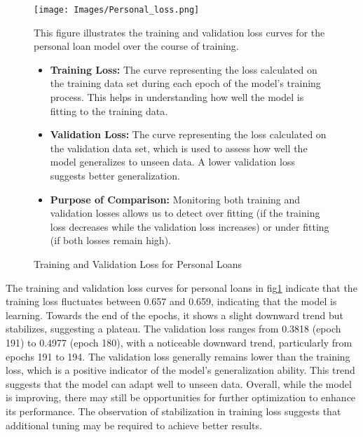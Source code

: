 \documentclass[a4paper]{article}
\begin{document}
\begin{figure}[H]
	\centering
	\texttt{[image: Images/Personal\_loss.png]} %
	\caption{Training and Validation Loss for Personal Loans}
	\label{fig:personal_loan_loss}
	\vspace{1em} %
	\begin{minipage}{0.7\textwidth} %
		This figure illustrates the training and validation loss curves for the personal loan model over the course of training.
		\begin{itemize}
			\item \textbf{Training Loss:} The curve representing the loss calculated on the training data set during each epoch of the model's training process. This helps in understanding how well the model is fitting to the training data.
			\item \textbf{Validation Loss:} The curve representing the loss calculated on the validation data set, which is used to assess how well the model generalizes to unseen data. A lower validation loss suggests better generalization.
			\item \textbf{Purpose of Comparison:} Monitoring both training and validation losses allows us to detect over fitting (if the training loss decreases while the validation loss increases) or under fitting (if both losses remain high).
		\end{itemize}
	\end{minipage}
\end{figure}
\vspace{1cm}
\noindent The training and validation loss curves for personal loans in fig\ref{fig:personal_loan_loss}  indicate that the training loss fluctuates between 0.657 and 0.659, indicating that the model is learning. Towards the end of the epochs, it shows a slight downward trend but stabilizes, suggesting a plateau. The validation loss ranges from 0.3818 (epoch 191) to 0.4977 (epoch 180), with a noticeable downward trend, particularly from epochs 191 to 194. The validation loss generally remains lower than the training loss, which is a positive indicator of the model's generalization ability. This trend suggests that the model can adapt well to unseen data. Overall, while the model is improving, there may still be opportunities for further optimization to enhance its performance. The observation of stabilization in training loss suggests that additional tuning may be required to achieve better results.\\
\end{document}
